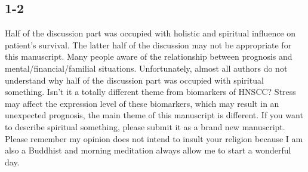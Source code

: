 \documentclass[preprint,12pt]{elsarticle}
\begin{document}


\subsection*{1-2}
\label{page:1-2}
Half of the discussion part was occupied with holistic and spiritual influence on patient’s survival.
The latter half of the discussion may not be appropriate for this manuscript. Many people aware of the relationship between prognosis and mental/financial/familial situations. Unfortunately, almost all authors do not understand why half of the discussion part was occupied with spiritual something. Isn’t it a totally different theme from biomarkers of HNSCC?
Stress may affect the expression level of these biomarkers, which may result in an unexpected prognosis, the main theme of this manuscript is different. If you want to describe spiritual something, please submit it as a brand new manuscript.
Please remember my opinion does not intend to insult your religion because I am also a Buddhist and morning meditation always allow me to start a wonderful day.
\end{document}
